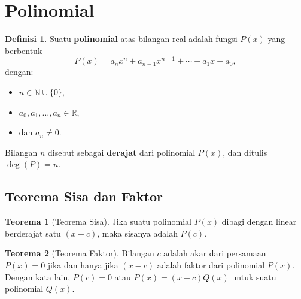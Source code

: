 \documentclass[aspectratio=169]{beamer}
\theoremstyle{definition}
\newtheorem{definisi}{Definisi}
\newtheorem{teorema}{Teorema}
\begin{document}
\section{Polinomial}
\begin{frame}{\insertsection}
  \begin{definisi}
    Suatu \textbf{polinomial} atas bilangan real adalah fungsi $P(x)$ yang berbentuk
    \[
      P(x) = a_n x^n + a_{n-1} x^{n-1} + \cdots + a_1 x + a_0,
    \]
    dengan:
    \begin{itemize}
      \item $n \in \mathbb{N} \cup \{0\}$,
      \item $a_0, a_1, \ldots, a_n \in \mathbb{R}$,
      \item dan $a_n \neq 0$.
    \end{itemize}
    Bilangan $n$ disebut sebagai \textbf{derajat} dari polinomial $P(x)$, dan ditulis $\deg(P) = n$.
  \end{definisi}
\end{frame}
\subsection{Teorema Sisa dan Faktor}
\begin{frame}{\insertsection}{\insertsubsection}
  \begin{teorema}[Teorema Sisa]
    Jika suatu polinomial $P(x)$ dibagi dengan linear berderajat satu $(x-c)$, maka sisanya adalah $P(c)$.
  \end{teorema}
  \begin{teorema}[Teorema Faktor]
    Bilangan $c$ adalah akar dari persamaan $P(x) = 0$ jika dan hanya jika $(x-c)$ adalah faktor dari polinomial $P(x)$. Dengan kata lain, $P(c) = 0$ atau $P(x)=(x-c)Q(x)$ untuk suatu polinomial $Q(x)$.
  \end{teorema}
\end{frame}
\end{document}
